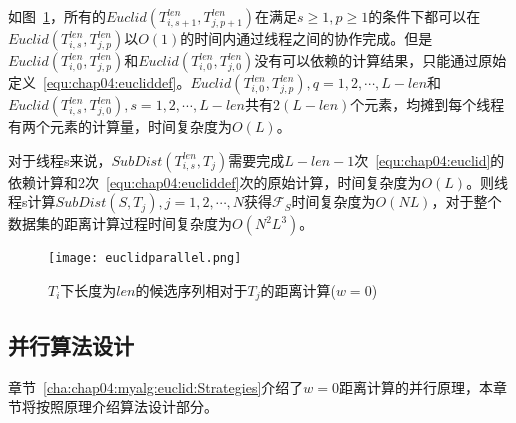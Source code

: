 如图~\ref{fig:euclidparallel}，所有的$Euclid(T_{i,s+1}^{len},T_{j,p+1}^{len})$在满足$s\geq1,p\geq1$的条件下都可以在$Euclid(T_{i,s}^{len},T_{j,p}^{len})$以$O(1)$的时间内通过线程之间的协作完成。但是$Euclid(T_{i,0}^{len},T_{j,p}^{len})$和$Euclid(T_{i,0}^{len},T_{j,0}^{len})$没有可以依赖的计算结果，只能通过原始定义~\ref{equ:chap04:eucliddef}。$Euclid(T_{i,0}^{len},T_{j,p}^{len}),q=1,2,\cdots,L-len$和$Euclid(T_{i,s}^{len},T_{j,0}^{len}),s=1,2,\cdots,L-len$共有$2(L-len)$个元素，均摊到每个线程有两个元素的计算量，时间复杂度为$O(L)$。

对于线程s来说，$SubDist(T_{i,s}^{len},T_j)$需要完成$L-len-1$次~\ref{equ:chap04:euclid}的依赖计算和2次~\ref{equ:chap04:eucliddef}次的原始计算，时间复杂度为$O(L)$。则线程s计算$SubDist(S,T_j),j=1,2,\cdots,N$获得$\mathcal{F}_S$时间复杂度为$O(NL)$，对于整个数据集的距离计算过程时间复杂度为$O(N^2L^3)$。

\begin{figure}[H] %
	\centering
	\texttt{[image: euclidparallel.png]}
	\caption{$T_i$下长度为$len$的候选序列相对于$T_j$的距离计算($w=0$)}
	\label{fig:euclidparallel}
\end{figure}

\subsection{并行算法设计}
\label{cha:chap04:myalg:euclid:algdesign}

章节~\ref{cha:chap04:myalg:euclid:Strategies}介绍了$w=0$距离计算的并行原理，本章节将按照原理介绍算法设计部分。


